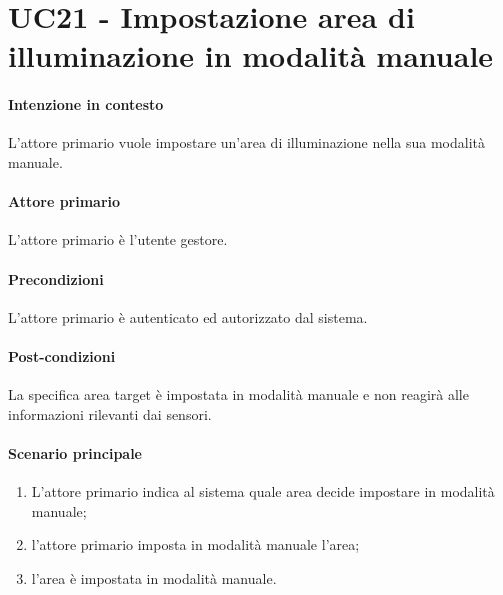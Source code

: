 \section{UC21 - Impostazione area di illuminazione in modalità manuale}\label{uc:21}
\paragraph{Intenzione in contesto} L'attore primario vuole impostare un'area di illuminazione nella sua modalità manuale.
\paragraph{Attore primario} L'attore primario è l'utente gestore.
\paragraph{Precondizioni} L'attore primario è autenticato ed autorizzato dal sistema.
\paragraph{Post-condizioni} La specifica area target è impostata in modalità manuale e non reagirà alle informazioni rilevanti dai sensori.
\paragraph{Scenario principale}
\begin{enumerate}
    \item L'attore primario indica al sistema quale area decide impostare in modalità manuale;
    \item l'attore primario imposta in modalità manuale l'area;
    \item l'area è impostata in modalità manuale.
\end{enumerate}